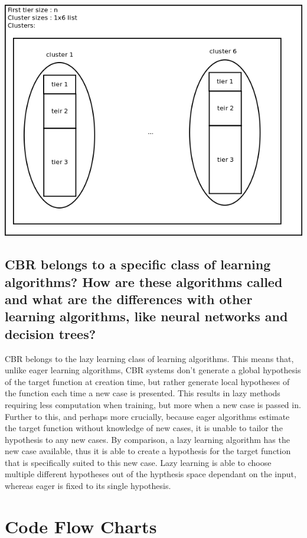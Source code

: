 \documentclass[11pt]{article}
\begin{document}
\begin{itemize}
\begin{itemize}
\includegraphics[width=\linewidth]{cbrdiagram.png}

\subsection{CBR belongs to a specific class of learning algorithms? How are these algorithms called and what are the differences with other learning algorithms, like neural networks and decision trees?}

CBR belongs to the lazy learning class of learning algorithms. This means that, unlike eager
learning algorithms, CBR systems don't generate a global hypothesis of the target function at
creation time, but rather generate local hypotheses of the function each time a new case is
presented. This results in lazy methods requiring less computation when training, but more
when a new case is passed in. Further to this, and perhaps more crucially, because eager
algorithms estimate the target function without knowledge of new cases, it is unable to tailor
the hypothesis to any new cases. By comparison, a lazy learning algorithm has the new case
available, thus it is able to create a hypothesis for the target function that is specifically
suited to this new case. Lazy learning is able to choose multiple different hypotheses out of
the hypthesis space dependant on the input, whereas eager is fixed to its single hypothesis.


\section{Code Flow Charts}


\end{itemize}
\end{itemize}
\end{document}
